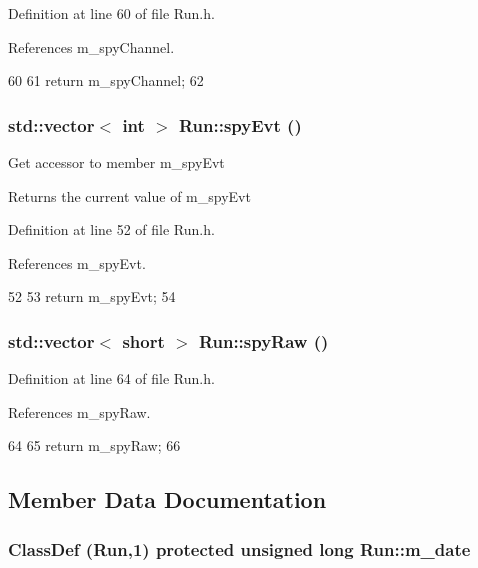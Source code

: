 Definition at line 60 of file Run.h.

References m\_\-spyChannel.


\begin{DoxyCode}
60                                  {
61     return m_spyChannel;
62   }
\end{DoxyCode}
\hypertarget{classRun_a01c526576b5b821696229b53f6afd624}{
\subsubsection[{spyEvt}]{\setlength{\rightskip}{0pt plus 5cm}std::vector$<$ int $>$ Run::spyEvt ()}}
\label{classRun_a01c526576b5b821696229b53f6afd624}
Get accessor to member m\_\-spyEvt \begin{DoxyReturn}{Returns}
the current value of m\_\-spyEvt 
\end{DoxyReturn}


Definition at line 52 of file Run.h.

References m\_\-spyEvt.


\begin{DoxyCode}
52                              {
53     return m_spyEvt;
54   }
\end{DoxyCode}
\hypertarget{classRun_af386b1e6d814454e347c5bd90b20bf2c}{
\subsubsection[{spyRaw}]{\setlength{\rightskip}{0pt plus 5cm}std::vector$<$ short $>$ Run::spyRaw ()}}
\label{classRun_af386b1e6d814454e347c5bd90b20bf2c}


Definition at line 64 of file Run.h.

References m\_\-spyRaw.


\begin{DoxyCode}
64                                {
65     return m_spyRaw;
66   }
\end{DoxyCode}


\subsection{Member Data Documentation}
\hypertarget{classRun_a841000f96566fdbe5772f16ef3963006}{
\subsubsection[{m\_\-date}]{\setlength{\rightskip}{0pt plus 5cm}ClassDef ({\bf Run},1) protected unsigned long {\bf Run::m\_\-date}}}
\label{classRun_a841000f96566fdbe5772f16ef3963006}


